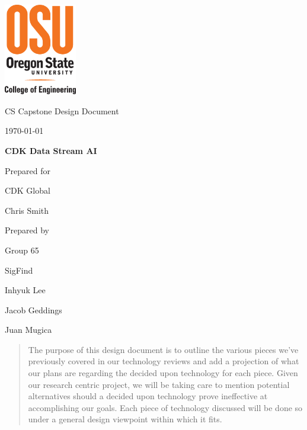 \documentclass[onecolumn, draftclsnofoot,10pt, compsoc]{IEEEtran}
\def \CapstoneTeamName{		SigFind}
\def \CapstoneTeamNumber{		65}
\def \GroupMemberOne{			Inhyuk Lee}
\def \GroupMemberTwo{			Jacob Geddings}
\def \GroupMemberThree{			Juan Mugica}
\def \CapstoneProjectName{		CDK Data Stream AI}
\def \CapstoneSponsorCompany{	CDK Global}
\def \CapstoneSponsorPerson{		Chris Smith}
\def \DocType{		%
				Design Document
				}
\begin{document}
\begin{titlepage}
    \begin{singlespace}
    	\includegraphics[height=4cm]{coe_v_spot1}
        \hfill 
        \par\vspace{.2in}
        \centering
        \scshape{
            \huge CS Capstone \DocType \par
            {\large\today}\par
            \vspace{.5in}
            \textbf{\Huge\CapstoneProjectName}\par
            \vfill
            {\large Prepared for}\par
            \Huge \CapstoneSponsorCompany\par
            \vspace{5pt}
            {\Large\CapstoneSponsorPerson\par}
            {\large Prepared by }\par
            Group\CapstoneTeamNumber\par
            \CapstoneTeamName\par 
            \vspace{5pt}
            {\Large
                \GroupMemberOne\par
                \GroupMemberTwo\par
               \GroupMemberThree\par
            }
            \vspace{20pt}
        }
        \begin{abstract}
	The purpose of this design document is to outline the various pieces we’ve previously covered in our technology reviews and add a projection of what our plans are regarding the decided upon technology for each piece. Given our research centric project, we will be taking care to mention potential alternatives should a decided upon technology prove ineffective at accomplishing our goals. Each piece of technology discussed will be done so under a general design viewpoint within which it fits.

        \end{abstract}     
    \end{singlespace}
\end{titlepage}
\newpage
{}
\tableofcontents
\clearpage
\end{document}
